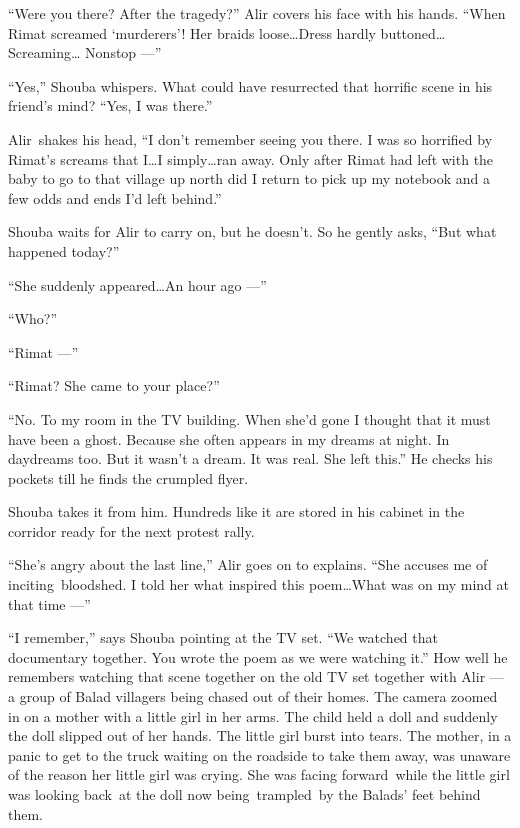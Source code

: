 \documentclass[twoside,11pt]{book}
\begin{document}
``Were you there? After the tragedy?'' Alir covers his face with his hands.
``When Rimat screamed `murderers'! Her braids loose{\ldots}Dress hardly buttoned{\ldots}Screaming{\ldots}
Nonstop ---''

``Yes,'' Shouba whispers. What could have resurrected that horrific scene in his friend's
mind?  {}``Yes, I was there.''

Alir~shakes his head, ``I don't remember seeing you there.{ }I was so horrified by Rimat's
screams that I{\ldots}I simply{\ldots}ran away. Only after Rimat had left with the baby to go to that village up north
did I return to pick up my notebook and a few odds and ends I'd left behind.''

Shouba waits for Alir to carry on, but he doesn't. So he gently asks, ``But what happened
today?''

``She suddenly appeared{\ldots}An hour ago ---''

``Who?''

``Rimat ---''

``Rimat? She came to your place?''

``No. To my room in the TV building. When she'd gone I thought that it must have been a ghost. Because she
often appears in my dreams at night. In daydreams too. But it wasn't a dream. It was real. She left
this.'' He checks his pockets till he finds the crumpled flyer.

Shouba takes it from him. Hundreds like it are stored in his cabinet in the corridor ready for the next protest rally.

``She's angry about the last line,'' Alir goes on to explains. ``She accuses me
of inciting~bloodshed. I told her what inspired this poem{\ldots}What was on my mind at that time ---''

``I remember,'' says Shouba pointing at the TV set. ``We watched that documentary
together. You wrote the poem as we were watching it.'' How well he remembers watching that scene together
on the old TV set together with Alir ---  a group of Balad villagers being chased out of their homes. The camera
zoomed in on a mother with a little girl in her arms. The child held a doll and suddenly the doll slipped out of her
hands. The little girl burst into tears. The mother, in a panic to get to the truck waiting on the roadside to take
them away, was unaware of the reason her little girl was crying. She was facing forward~while the little girl was
looking back~at the doll now being~trampled~by the Balads{'} feet behind them.
\end{document}
